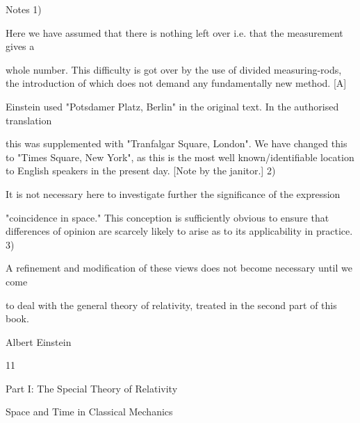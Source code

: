 \documentclass{article}
\begin{document}
Notes
1)

Here we have assumed that there is nothing left over i.e. that the measurement gives a

whole number. This difficulty is got over by the use of divided measuring-rods, the
introduction of which does not demand any fundamentally new method.
[A]

Einstein used "Potsdamer Platz, Berlin" in the original text. In the authorised translation

this was supplemented with "Tranfalgar Square, London". We have changed this to "Times
Square, New York", as this is the most well known/identifiable location to English speakers
in the present day. [Note by the janitor.]
2)

It is not necessary here to investigate further the significance of the expression

"coincidence in space." This conception is sufficiently obvious to ensure that differences of
opinion are scarcely likely to arise as to its applicability in practice.
3)

A refinement and modification of these views does not become necessary until we come

to deal with the general theory of relativity, treated in the second part of this book.

Albert Einstein

11

Part I: The Special Theory of Relativity

Space and Time in Classical
Mechanics
\end{document}
